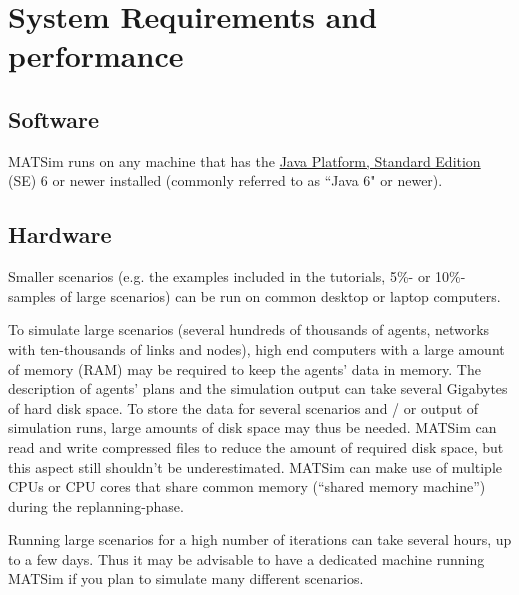 \chapter{System Requirements and performance}


\bigskip


\section{Software}

MATSim runs on any machine that has the \href{http://java.sun.com/javase/downloads/index.jsp}{Java Platform, Standard Edition} (SE) 6 or newer installed (commonly referred to as ``Java 6" or newer).

\section{Hardware}

Smaller  scenarios (e.g. the examples included in the tutorials, 5\%- or  10\%-samples of large scenarios) can be run on common desktop or laptop  computers.

To simulate large scenarios (several hundreds of  thousands of agents, networks with ten-thousands of links and nodes),  high end computers with a large amount of memory (RAM) may be required  to keep the agents' data in memory. The description of agents' plans and  the simulation output can take several Gigabytes of hard disk space. To  store the data for several scenarios and / or output of simulation  runs, large amounts of disk space may thus be needed. MATSim can read  and write compressed files to reduce the amount of required disk space,  but this aspect still shouldn't be underestimated. MATSim can make use  of multiple CPUs or CPU cores that share common memory (``shared memory  machine'') during the replanning-phase.

Running large scenarios for  a high number of iterations can take several hours, up to a few days.  Thus it may be advisable to have a dedicated machine running MATSim if  you plan to simulate many different scenarios.

